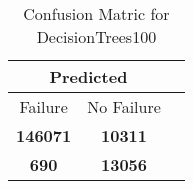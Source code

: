 \begin{table}[] 
\caption{Confusion Matric for DecisionTrees100} 
\label{Table: Prediction Accuracy-NoneDecisionTrees10075.0EKF-ignoreReflection-Reflection} 
\centering 
\begin{tabular} 
 {@{}ccc@{}} 
\toprule 
\multicolumn{2}{c}{\textbf{Predicted}}
 \\ \midrule 
\multicolumn{1}{|c|}{Failure} & 
\multicolumn{1}{c|}{No Failure}
 \\ \midrule 
\multicolumn{1}{|c|}{\color{green}\textbf{146071}} & 
\multicolumn{1}{c|}{\color{red}\textbf{10311}}
 \\ \midrule 
\multicolumn{1}{|c|}{\color{red}\textbf{690}} & 
\multicolumn{1}{c|}{\color{green}\textbf{13056}}
 \\ \bottomrule 
\end{tabular} 
\end{table} 

